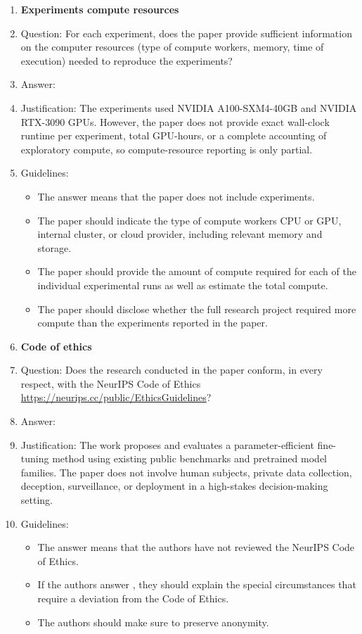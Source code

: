 \begin{enumerate}
\item {\bf Experiments compute resources}
    \item[] Question: For each experiment, does the paper provide sufficient information on the computer resources (type of compute workers, memory, time of execution) needed to reproduce the experiments?
    \item[] Answer: \answerNo{}
    \item[] Justification: The experiments used NVIDIA A100-SXM4-40GB and NVIDIA RTX-3090 GPUs. However, the paper does not provide exact wall-clock runtime per experiment, total GPU-hours, or a complete accounting of exploratory compute, so compute-resource reporting is only partial.
    \item[] Guidelines:
    \begin{itemize}
        \item The answer \answerNA{} means that the paper does not include experiments.
        \item The paper should indicate the type of compute workers CPU or GPU, internal cluster, or cloud provider, including relevant memory and storage.
        \item The paper should provide the amount of compute required for each of the individual experimental runs as well as estimate the total compute. 
        \item The paper should disclose whether the full research project required more compute than the experiments reported in the paper.
    \end{itemize}
    
\item {\bf Code of ethics}
    \item[] Question: Does the research conducted in the paper conform, in every respect, with the NeurIPS Code of Ethics \url{https://neurips.cc/public/EthicsGuidelines}?
    \item[] Answer: \answerYes{}
    \item[] Justification: The work proposes and evaluates a parameter-efficient fine-tuning method using existing public benchmarks and pretrained model families. The paper does not involve human subjects, private data collection, deception, surveillance, or deployment in a high-stakes decision-making setting.
    \item[] Guidelines:
    \begin{itemize}
        \item The answer \answerNA{} means that the authors have not reviewed the NeurIPS Code of Ethics.
        \item If the authors answer \answerNo{}, they should explain the special circumstances that require a deviation from the Code of Ethics.
        \item The authors should make sure to preserve anonymity.
    \end{itemize}


\end{enumerate}
